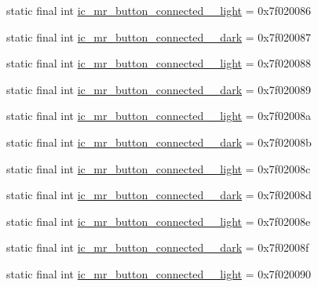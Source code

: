\begin{CompactItemize}
\item 
static final int \hyperlink{classandroid_1_1support_1_1v7_1_1mediarouter_1_1_r_1_1drawable_5ef0828840a2414ad01ed6ead4a116e8}{ic\_\-mr\_\-button\_\-connected\_\_\-light} = 0x7f020086
\item 
static final int \hyperlink{classandroid_1_1support_1_1v7_1_1mediarouter_1_1_r_1_1drawable_2a334d8e6d81458cd6e2a0e10e63dc6a}{ic\_\-mr\_\-button\_\-connected\_\_\-dark} = 0x7f020087
\item 
static final int \hyperlink{classandroid_1_1support_1_1v7_1_1mediarouter_1_1_r_1_1drawable_44c7fb91619015b05b4a24ee70daf860}{ic\_\-mr\_\-button\_\-connected\_\_\-light} = 0x7f020088
\item 
static final int \hyperlink{classandroid_1_1support_1_1v7_1_1mediarouter_1_1_r_1_1drawable_130911ab4a936acd1d25f4d8a0e472f7}{ic\_\-mr\_\-button\_\-connected\_\_\-dark} = 0x7f020089
\item 
static final int \hyperlink{classandroid_1_1support_1_1v7_1_1mediarouter_1_1_r_1_1drawable_0be5e90efc2e4c10043ed77d5d50985a}{ic\_\-mr\_\-button\_\-connected\_\_\-light} = 0x7f02008a
\item 
static final int \hyperlink{classandroid_1_1support_1_1v7_1_1mediarouter_1_1_r_1_1drawable_aa7507c6e63f47a8b1ff143218e71c85}{ic\_\-mr\_\-button\_\-connected\_\_\-dark} = 0x7f02008b
\item 
static final int \hyperlink{classandroid_1_1support_1_1v7_1_1mediarouter_1_1_r_1_1drawable_bb6463f5c65dce05a5ebe497b7443b7c}{ic\_\-mr\_\-button\_\-connected\_\_\-light} = 0x7f02008c
\item 
static final int \hyperlink{classandroid_1_1support_1_1v7_1_1mediarouter_1_1_r_1_1drawable_ba8d68b4ea1ad9d17008613b02d91b5c}{ic\_\-mr\_\-button\_\-connected\_\_\-dark} = 0x7f02008d
\item 
static final int \hyperlink{classandroid_1_1support_1_1v7_1_1mediarouter_1_1_r_1_1drawable_8692f66333f95aedef6ff41ba41e9573}{ic\_\-mr\_\-button\_\-connected\_\_\-light} = 0x7f02008e
\item 
static final int \hyperlink{classandroid_1_1support_1_1v7_1_1mediarouter_1_1_r_1_1drawable_4ef13f88564a5645445a8f8a9c060fd1}{ic\_\-mr\_\-button\_\-connected\_\_\-dark} = 0x7f02008f
\item 
static final int \hyperlink{classandroid_1_1support_1_1v7_1_1mediarouter_1_1_r_1_1drawable_0581ceb22a5b7beb8d9fad3840ebc47c}{ic\_\-mr\_\-button\_\-connected\_\_\-light} = 0x7f020090
\item 

\end{CompactItemize}
